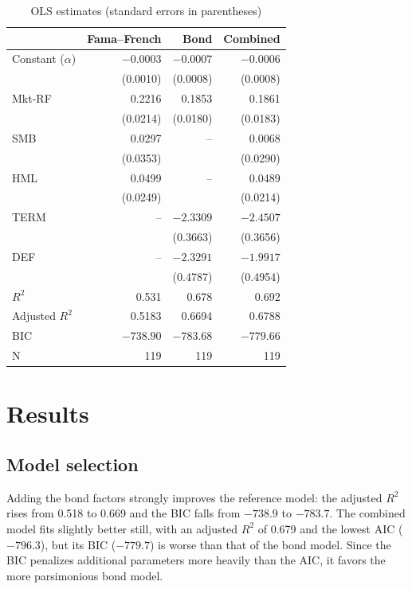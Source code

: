 \documentclass[11pt,a4paper]{article}
\begin{document}
\begin{table}[H]
\centering
\caption{OLS estimates (standard errors in parentheses)}
\small
\begin{tabular}{lrrr}
\toprule
 & Fama--French & Bond & Combined \\
\midrule
Constant ($\alpha$) & $-0.0003$ & $-0.0007$ & $-0.0006$ \\
 & (0.0010) & (0.0008) & (0.0008) \\
Mkt-RF & 0.2216 & 0.1853 & 0.1861 \\
 & (0.0214) & (0.0180) & (0.0183) \\
SMB & 0.0297 & -- & 0.0068 \\
 & (0.0353) & & (0.0290) \\
HML & 0.0499 & -- & 0.0489 \\
 & (0.0249) & & (0.0214) \\
TERM & -- & $-2.3309$ & $-2.4507$ \\
 & & (0.3663) & (0.3656) \\
DEF & -- & $-2.3291$ & $-1.9917$ \\
 & & (0.4787) & (0.4954) \\
\midrule
$R^2$ & 0.531 & 0.678 & 0.692 \\
Adjusted $R^2$ & 0.5183 & 0.6694 & 0.6788 \\
BIC & $-738.90$ & $-783.68$ & $-779.66$ \\
N & 119 & 119 & 119 \\
\bottomrule
\end{tabular}
\label{tab:ols}
\end{table}

\section{Results}

\subsection{Model selection}

Adding the bond factors strongly improves the reference model: the adjusted $R^2$ rises from 0.518 to 0.669 and the BIC falls from $-738.9$ to $-783.7$. The combined model fits slightly better still, with an adjusted $R^2$ of 0.679 and the lowest AIC ($-796.3$), but its BIC ($-779.7$) is worse than that of the bond model. Since the BIC penalizes additional parameters more heavily than the AIC, it favors the more parsimonious bond model.
\end{document}
